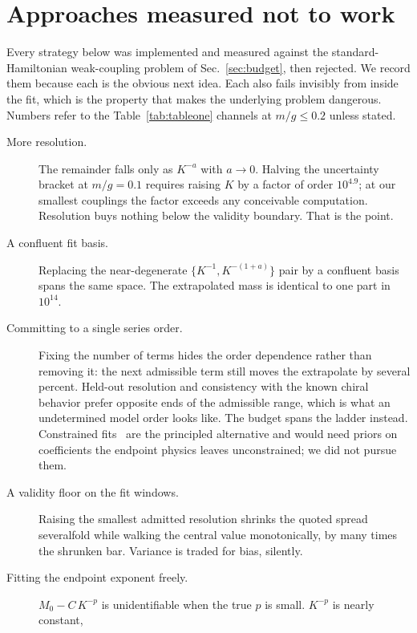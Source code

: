 \section{Approaches measured not to work}
\label{app:donotretry}

Every strategy below was implemented and measured against the
standard-Hamiltonian weak-coupling problem of Sec.~\ref{sec:budget}, then
rejected.  We record them because each is the obvious next idea.  Each also
fails invisibly from inside the fit, which is the property that makes the
underlying problem dangerous.  Numbers refer to the
Table~\ref{tab:tableone} channels at $m/g \le 0.2$ unless stated.

\begin{description}
\item[More resolution.]  The remainder falls only as $K^{-a}$ with
  $a \to 0$.  Halving the uncertainty bracket at $m/g = 0.1$ requires
  raising $K$ by a factor of order $10^{4.9}$; at our smallest couplings
  the factor exceeds any conceivable computation.  Resolution buys nothing
  below the validity boundary.  That is the point.
\item[A confluent fit basis.]  Replacing the near-degenerate
  $\{K^{-1}, K^{-(1+a)}\}$ pair by a confluent basis spans the same space.
  The extrapolated mass is identical to one part in $10^{14}$.
\item[Committing to a single series order.]  Fixing the number of terms
  hides the order dependence rather than removing it: the next admissible
  term still moves the extrapolate by several percent.  Held-out resolution
  and consistency with the known chiral behavior prefer opposite ends of
  the admissible range, which is what an undetermined model order looks
  like.  The budget spans the ladder instead.  Constrained
  fits~\cite{Lepage:2001ym} are the principled alternative and would need
  priors on coefficients the endpoint physics leaves unconstrained; we did
  not pursue them.
\item[A validity floor on the fit windows.]  Raising the smallest admitted
  resolution shrinks the quoted spread severalfold while walking the
  central value monotonically, by many times the shrunken bar.  Variance is
  traded for bias, silently.
\item[Fitting the endpoint exponent freely.]  $M_0 - C\,K^{-p}$ is
  unidentifiable when the true $p$ is small.  $K^{-p}$ is nearly constant,

\end{description}

